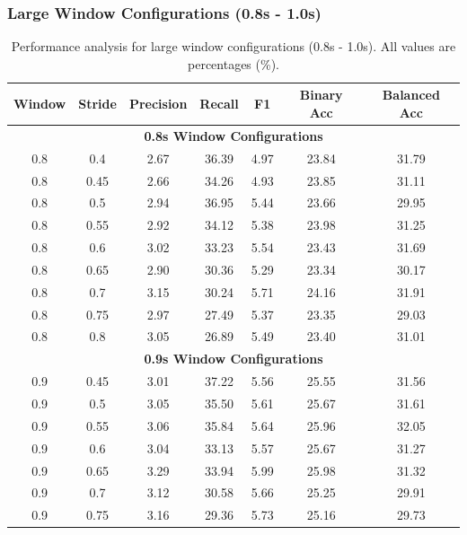 \documentclass[11pt]{article}
\begin{document}
\subsubsection{Large Window Configurations (0.8s - 1.0s)}

\begin{table}[H]
    \caption{Performance analysis for large window configurations (0.8s - 1.0s). All values are percentages (\%).}
    \centering
    \label{tab:large-window-configs}
    \footnotesize
    \begin{tabular}{|c|c|c|c|c|c|c|}
        \hline
        \textbf{Window} & \textbf{Stride} & \textbf{Precision} & \textbf{Recall} & \textbf{F1} & \textbf{Binary Acc} & \textbf{Balanced Acc} \\
        \hline
        \multicolumn{7}{|c|}{\textbf{0.8s Window Configurations}} \\
        \hline
        0.8 & 0.4 & 2.67 & 36.39 & 4.97 & 23.84 & 31.79 \\
        0.8 & 0.45 & 2.66 & 34.26 & 4.93 & 23.85 & 31.11 \\
        0.8 & 0.5 & 2.94 & 36.95 & 5.44 & 23.66 & 29.95 \\
        0.8 & 0.55 & 2.92 & 34.12 & 5.38 & 23.98 & 31.25 \\
        0.8 & 0.6 & 3.02 & 33.23 & 5.54 & 23.43 & 31.69 \\
        0.8 & 0.65 & 2.90 & 30.36 & 5.29 & 23.34 & 30.17 \\
        0.8 & 0.7 & 3.15 & 30.24 & 5.71 & 24.16 & 31.91 \\
        0.8 & 0.75 & 2.97 & 27.49 & 5.37 & 23.35 & 29.03 \\
        0.8 & 0.8 & 3.05 & 26.89 & 5.49 & 23.40 & 31.01 \\
        \hline
        \multicolumn{7}{|c|}{\textbf{0.9s Window Configurations}} \\
        \hline
        0.9 & 0.45 & 3.01 & 37.22 & 5.56 & 25.55 & 31.56 \\
        0.9 & 0.5 & 3.05 & 35.50 & 5.61 & 25.67 & 31.61 \\
        0.9 & 0.55 & 3.06 & 35.84 & 5.64 & 25.96 & 32.05 \\
        0.9 & 0.6 & 3.04 & 33.13 & 5.57 & 25.67 & 31.27 \\
        0.9 & 0.65 & 3.29 & 33.94 & 5.99 & 25.98 & 31.32 \\
        0.9 & 0.7 & 3.12 & 30.58 & 5.66 & 25.25 & 29.91 \\
        0.9 & 0.75 & 3.16 & 29.36 & 5.73 & 25.16 & 29.73 \\

\end{tabular}
\end{table}
\end{document}
